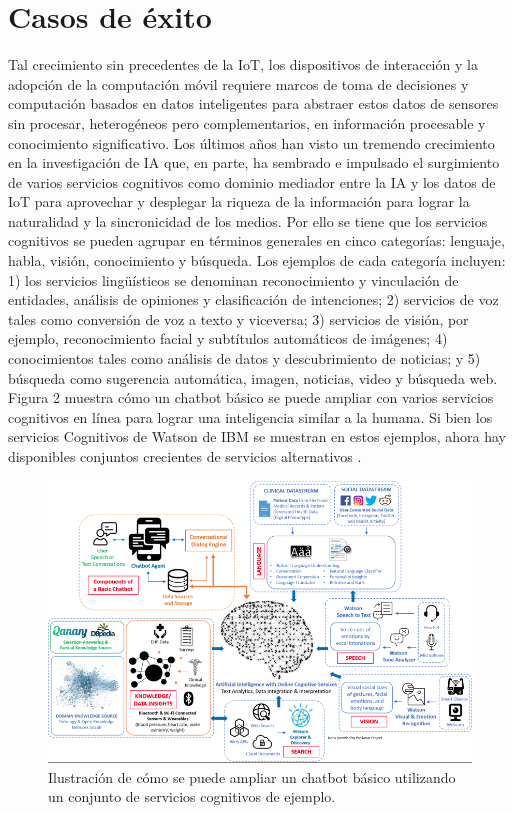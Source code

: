 \section{Casos de éxito}
Tal crecimiento sin precedentes de la IoT, los dispositivos de interacción y la adopción de la computación móvil requiere marcos de toma de decisiones y computación basados en datos inteligentes para abstraer estos datos de sensores sin procesar, heterogéneos pero complementarios, en información procesable y conocimiento significativo. Los últimos años han visto un tremendo crecimiento en la investigación de IA que, en parte, ha sembrado e impulsado el surgimiento de varios servicios cognitivos como dominio mediador entre la IA y los datos de IoT para aprovechar y desplegar la riqueza de la información para lograr la naturalidad y la sincronicidad de los medios.
Por ello se tiene que los servicios cognitivos se pueden agrupar en términos generales en cinco categorías: lenguaje, habla, visión, conocimiento y búsqueda. Los ejemplos de cada categoría incluyen: 1) los servicios lingüísticos se denominan reconocimiento y vinculación de entidades, análisis de opiniones y clasificación de intenciones; 2) servicios de voz tales como conversión de voz a texto y viceversa; 3) servicios de visión, por ejemplo, reconocimiento facial y subtítulos automáticos de imágenes; 4) conocimientos tales como análisis de datos y descubrimiento de noticias; y 5) búsqueda como sugerencia automática, imagen, noticias, video y búsqueda web.  Figura 2 muestra
 cómo un chatbot básico se puede ampliar con varios servicios cognitivos en línea para lograr una inteligencia similar a la humana. Si bien los servicios Cognitivos de Watson de IBM se muestran en estos ejemplos, ahora hay disponibles conjuntos crecientes de servicios alternativos \cite{Molnar2019}.

\begin{figure}[htbp]
\centerline{\includegraphics[width = 0.5 \textwidth]{fig02.png}}
\caption{Ilustración de cómo se puede ampliar un chatbot básico utilizando un conjunto de servicios cognitivos de ejemplo.}
\label{fig2}
\end{figure}
{\color{red}}

